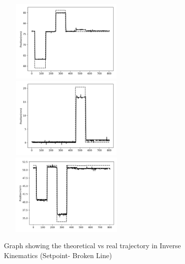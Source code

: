 \documentclass[12pt]{report}
\begin{document}
    \begin{figure}[H]
	\centering
      \includegraphics[width=0.6\textwidth, height =4cm]{Images/PosPlotX.png} %
      \includegraphics[width=0.6\textwidth, height =4cm]{Images/PosPlotY.png} %
      \includegraphics[width=0.6\textwidth, height =4cm]{Images/PosPlotZ.png} %
  	\caption{Graph showing the theoretical vs real trajectory in Inverse Kinematics (Setpoint- Broken Line)}
  	\label{fig:IK}
\end{figure}
\end{document}

